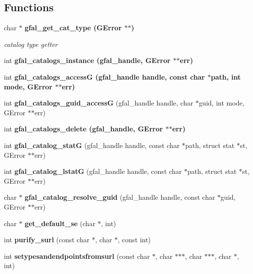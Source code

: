 \subsection*{Functions}
\begin{CompactItemize}
\item 
char $\ast$ \bf{gfal\_\-get\_\-cat\_\-type} (GError $\ast$$\ast$)
\begin{CompactList}\small\item\em catalog type getter \item\end{CompactList}\item 
int \bf{gfal\_\-catalogs\_\-instance} (gfal\_\-handle, GError $\ast$$\ast$err)
\item 
int \bf{gfal\_\-catalogs\_\-access\-G} (gfal\_\-handle handle, const char $\ast$path, int mode, GError $\ast$$\ast$err)
\item 
int \textbf{gfal\_\-catalogs\_\-guid\_\-access\-G} (gfal\_\-handle handle, char $\ast$guid, int mode, GError $\ast$$\ast$err)\label{gfal__common__catalog_8h_fdd144370f8c6df2564eaddbf26e2fd5}

\item 
int \bf{gfal\_\-catalogs\_\-delete} (gfal\_\-handle, GError $\ast$$\ast$err)
\item 
int \textbf{gfal\_\-catalog\_\-stat\-G} (gfal\_\-handle handle, const char $\ast$path, struct stat $\ast$st, GError $\ast$$\ast$err)\label{gfal__common__catalog_8h_28ca68c00e4a67bc158975ef3e4f8013}

\item 
int \textbf{gfal\_\-catalog\_\-lstat\-G} (gfal\_\-handle handle, const char $\ast$path, struct stat $\ast$st, GError $\ast$$\ast$err)\label{gfal__common__catalog_8h_1ad1b1f96272dbf43a15e7ea5d35389d}

\item 
char $\ast$ \textbf{gfal\_\-catalog\_\-resolve\_\-guid} (gfal\_\-handle handle, const char $\ast$guid, GError $\ast$$\ast$err)\label{gfal__common__catalog_8h_4955825d7c275f3dfae9a57232642370}

\item 
char $\ast$ \textbf{get\_\-default\_\-se} (char $\ast$, int)\label{gfal__common__catalog_8h_c304a754c49bedeec6c1c9b1445b937d}

\item 
int \textbf{purify\_\-surl} (const char $\ast$, char $\ast$, const int)\label{gfal__common__catalog_8h_c25d6ed82e636c14d640318a2ad5f3b5}

\item 
int \textbf{setypesandendpointsfromsurl} (const char $\ast$, char $\ast$$\ast$$\ast$, char $\ast$$\ast$$\ast$, char $\ast$, int)\label{gfal__common__catalog_8h_f398c539d03eaea6dcb6b45067cb21f2}


\end{CompactItemize}
